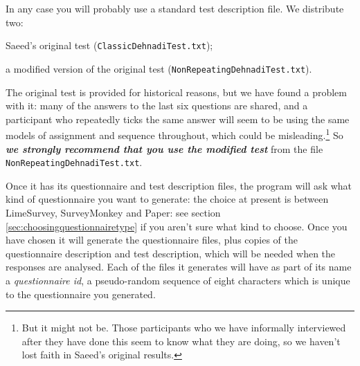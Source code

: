 \documentclass[11pt,a4paper]{article}
\newcommand{\secref}[1]{section \ref{sec:#1}}
\begin{document}
In any case you will probably use a standard test description file. We distribute two:
\begin{itemize*}
\item Saeed's original test (\texttt{ClassicDehnadiTest.txt});
\item a modified version of the original test (\texttt{NonRepeatingDehnadiTest.txt}).
\end{itemize*}
The original test is provided for historical reasons, but we have found a problem with it: many of the answers to the last six questions are shared, and a participant who repeatedly ticks the same answer will seem to be using the same models of assignment and sequence throughout, which could be misleading.\footnote{But it might not be. Those participants who we have informally interviewed after they have done this seem to know what they are doing, so we haven't lost faith in Saeed's original results.} So \textit{\textbf{we strongly recommend that you use the modified test}} from the file \texttt{NonRepeatingDehnadiTest.txt}.

Once it has its questionnaire and test description files, the program will ask what kind of questionnaire you want to generate: the choice at present is between LimeSurvey, SurveyMonkey and Paper: see \secref{choosingquestionnairetype} if you aren't sure what kind to choose. Once you have chosen it will generate the questionnaire files, plus copies of the questionnaire description and test description, which will be needed when the responses are analysed. Each of the files it generates will have as part of its name a \emph{questionnaire id}, a pseudo-random sequence of eight characters which is unique to the questionnaire you generated. 
\end{document}
